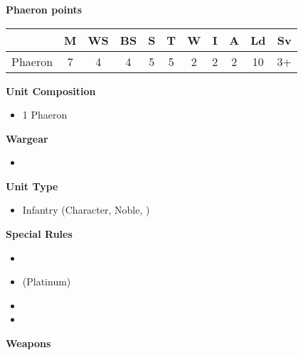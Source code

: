 \newpage
\subsubsection[Phaeron]{}

\begin{minipage}[t]{0.72\textwidth}
	{\large \textbf{Phaeron  points}}
	
	\begin{tabular}{m{165 pt} *{10}{c}}
		& M & WS & BS & S & T & W & I & A & Ld & Sv \\
		\hline
		Phaeron & 7 & 4 & 4 & 5 & 5 & 2 & 2 & 2 & 10 & 3+ \\
	\end{tabular}
	\small
	\begin{minipage}{0.5\textwidth}
		\vspace*{2em}
		\textbf{Unit Composition}
		\begin{itemize}
			\item 1 Phaeron
		\end{itemize}
		
		\textbf{Wargear}
		\begin{itemize}
			\item {}
		\end{itemize}
	\end{minipage}
	\begin{minipage}{0.5\textwidth}
		\vspace*{2em}
		\textbf{Unit Type}
		\begin{itemize}
			\item Infantry (Character, Noble, )
		\end{itemize}
		
		\textbf{Special Rules}
		\begin{itemize}
			\item {}
			\item {} (Platinum)
			\item {}
			\item {}
		\end{itemize}
	\end{minipage}
	
	\vspace*{2em}
	\textbf{Weapons}
	

\end{minipage}
